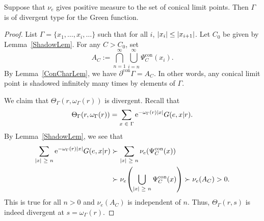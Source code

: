 \documentclass[10pt]{amsart}
\theoremstyle{definition}\newtheorem{defi}[theo]{Definition}\newtheorem{rema}[theo]{Remark}\newtheorem{exam}[theo]{Example}\newtheorem{exem}[theo]{Example}\newtheorem{nota}[theo]{Notation}
\newcommand{\rme}{\mathrm{e}}
\DeclareMathOperator{\con}{con}
\let\originalleft\left
\let\originalright\right
\renewcommand{\left}{\mathopen{}\mathclose\bgroup\originalleft}
\renewcommand{\right}{\aftergroup\egroup\originalright}
\let\oldin\in
\renewcommand{\in}{\mathchoice{\oldin}{\oldin}{\,\oldin\,}{\,\oldin\,}}
\let\oldge\ge
\renewcommand{\ge}{\mathchoice{\oldge}{\oldge}{\,\oldge\,}{\,\oldge\,}}
\let\oldle\le
\renewcommand{\le}{\mathchoice{\oldle}{\oldle}{\,\oldle\,}{\,\oldle\,}}
\begin{document}
\begin{prop}\label{PosMeasonConcialProp}
Suppose that $\nu_e$ gives positive measure to the set of conical limit points. Then $\Gamma$ is of divergent type for the Green function.
\end{prop}
\begin{proof}
List $\Gamma = \{x_1, \dotso, x_i, \dots\}$ such that for all $i$, $|x_i|\le | x_{i+1}|$. Let $C_0$ be given by Lemma~\ref{ShadowLem}. For any $C>C_0$, set
\begin{equation}\label{conicalset}
A_{C} := \bigcap_{n=1}^{\infty} \bigcup_{i=n}^{\infty}
\Psi_{C}^{\con}(x_i).
\end{equation}
By Lemma~\ref{ConCharLem}, we have $\partial^{\con}\Gamma =A_{C}$. In other words, any conical limit point is shadowed infinitely many times by elements of $\Gamma$.

We claim that $\Theta_{\Gamma}(r,\omega_\Gamma(r))$ is divergent. Recall that
\[
\Theta_{\Gamma}(r,\omega_\Gamma(r)) = \sum\limits_{x \in \Gamma} \rme^{-\omega_\Gamma(r)|x|}G(e,x|r).
\]
By Lemma~\ref{ShadowLem}, we see that
\begin{align*}
\sum_{|x|\ge n} \rme^{-\omega_\Gamma(r)|x|}G(e,x|r) & \succ \sum_{|x|\ge n} \nu_e(\Psi^{\con}_{C}(x)) \\
&\succ \nu_e\left(\bigcup_{|x|\ge n} \Psi^{\con}_C(x)\right) \succ \nu_e(A_{C}) > 0.
\end{align*}
This is true for all $n > 0$ and $\nu_e(A_{C})$ is independent of $n$. Thus, $\Theta_{\Gamma}(r,s)$ is indeed divergent at $s=\omega_\Gamma(r)$.
\end{proof}
\end{document}
